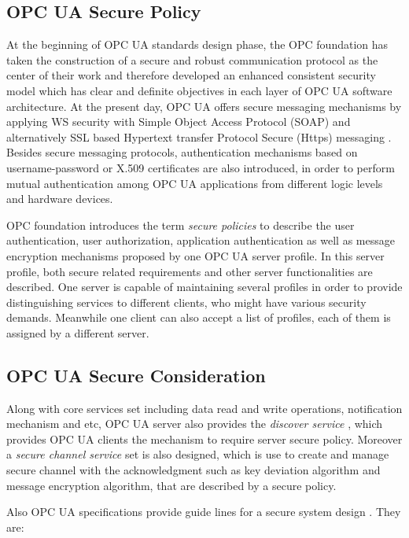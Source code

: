 \subsection{OPC UA Secure Policy}
At the beginning of OPC UA standards design phase, the OPC foundation has taken the construction of a secure and robust communication protocol as the center of their work and therefore developed an enhanced consistent security model which has clear and definite objectives in each layer of OPC UA software architecture. At the present day, OPC UA  offers secure messaging mechanisms by applying WS security with Simple Object Access Protocol (SOAP)  and alternatively SSL based Hypertext transfer Protocol Secure (Https) messaging \cite{opc_secure_1}. Besides secure messaging protocols,  authentication mechanisms based on username-password or X.509 certificates are also introduced, in order to perform mutual authentication among OPC UA applications from different logic levels and hardware devices.

OPC foundation introduces the term \emph{secure policies} \cite{O2} to describe the 
user authentication, user authorization, application authentication as well as message encryption mechanisms proposed by one OPC UA server profile. In this server profile, both secure related requirements and other server functionalities are described. One server is capable of maintaining several profiles in order to provide distinguishing services to different clients, who might have various security demands. Meanwhile one client can also accept a list of profiles, each of them is assigned by a different server. 

\subsection{OPC UA Secure Consideration}
Along with core services set including data read and write operations, notification mechanism and etc, OPC UA server also provides the \emph{discover service} \cite{O4}, which provides OPC UA clients the mechanism to require server secure policy. Moreover a \emph{secure channel service} set \cite{O4} is also designed, which is use to create and manage secure channel with the acknowledgment such as key deviation algorithm and message encryption algorithm, that are described by a secure policy. 

Also OPC UA specifications provide guide lines for a secure system design \cite{O4}. They are:


